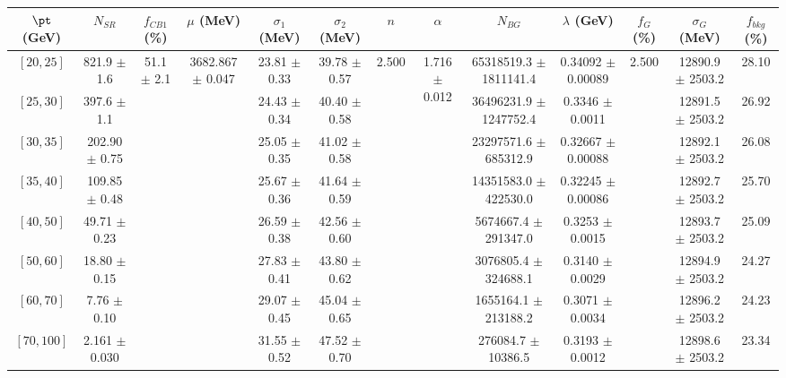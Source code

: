 \begin{tabular}{c||c|c|c|c|c|c|c|c|c|c|c||c}
$\pt$ (GeV) & $N_{SR}$ & $f_{CB1}$ (\%) & $\mu$ (MeV) & $\sigma_1$ (MeV) & $\sigma_2$ (MeV) & $n$ & $\alpha$ & $N_{BG}$ & $\lambda$ (GeV) & $f_G$ (\%) & $\sigma_G$ (MeV) & $f_{bkg}$ (\%) \\
\hline
$[20, 25]$ & 821.9 $\pm$ 1.6 & \multirow{8}{*}{51.1 $\pm$ 2.1} & \multirow{8}{*}{3682.867 $\pm$ 0.047} & 23.81 $\pm$ 0.33 & 39.78 $\pm$ 0.57 & \multirow{8}{*}{2.500} & \multirow{8}{*}{1.716 $\pm$ 0.012} & 65318519.3 $\pm$ 1811141.4 & 0.34092 $\pm$ 0.00089 & \multirow{8}{*}{2.500} & 12890.9 $\pm$ 2503.2 & 28.10\\
$[25, 30]$ & 397.6 $\pm$ 1.1 &  &  & 24.43 $\pm$ 0.34 & 40.40 $\pm$ 0.58 &  &  & 36496231.9 $\pm$ 1247752.4 & 0.3346 $\pm$ 0.0011 &  & 12891.5 $\pm$ 2503.2 & 26.92\\
$[30, 35]$ & 202.90 $\pm$ 0.75 &  &  & 25.05 $\pm$ 0.35 & 41.02 $\pm$ 0.58 &  &  & 23297571.6 $\pm$ 685312.9 & 0.32667 $\pm$ 0.00088 &  & 12892.1 $\pm$ 2503.2 & 26.08\\
$[35, 40]$ & 109.85 $\pm$ 0.48 &  &  & 25.67 $\pm$ 0.36 & 41.64 $\pm$ 0.59 &  &  & 14351583.0 $\pm$ 422530.0 & 0.32245 $\pm$ 0.00086 &  & 12892.7 $\pm$ 2503.2 & 25.70\\
$[40, 50]$ & 49.71 $\pm$ 0.23 &  &  & 26.59 $\pm$ 0.38 & 42.56 $\pm$ 0.60 &  &  & 5674667.4 $\pm$ 291347.0 & 0.3253 $\pm$ 0.0015 &  & 12893.7 $\pm$ 2503.2 & 25.09\\
$[50, 60]$ & 18.80 $\pm$ 0.15 &  &  & 27.83 $\pm$ 0.41 & 43.80 $\pm$ 0.62 &  &  & 3076805.4 $\pm$ 324688.1 & 0.3140 $\pm$ 0.0029 &  & 12894.9 $\pm$ 2503.2 & 24.27\\
$[60, 70]$ & 7.76 $\pm$ 0.10 &  &  & 29.07 $\pm$ 0.45 & 45.04 $\pm$ 0.65 &  &  & 1655164.1 $\pm$ 213188.2 & 0.3071 $\pm$ 0.0034 &  & 12896.2 $\pm$ 2503.2 & 24.23\\
$[70, 100]$ & 2.161 $\pm$ 0.030 &  &  & 31.55 $\pm$ 0.52 & 47.52 $\pm$ 0.70 &  &  & 276084.7 $\pm$ 10386.5 & 0.3193 $\pm$ 0.0012 &  & 12898.6 $\pm$ 2503.2 & 23.34\\
\end{tabular}

